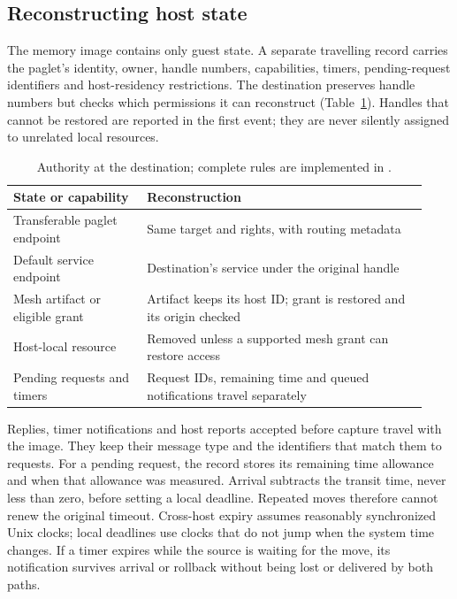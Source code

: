 \subsection{Reconstructing host state}\label{sec:movement-record}

The memory image contains only guest state. A separate travelling record
carries the paglet's identity, owner, handle numbers, capabilities, timers,
pending-request identifiers and host-residency restrictions. The
destination preserves handle numbers but checks which permissions it can
reconstruct (Table~\ref{tab:movement-caps}). Handles that cannot be restored
are reported in the first  event; they are never silently
assigned to unrelated local resources.

\begin{table}[!ht]
\centering\small
\caption{Authority at the destination; complete rules are implemented in
.}
\label{tab:movement-caps}
\begin{tabular}{p{0.30\linewidth}p{0.63\linewidth}}
\toprule
State or capability & Reconstruction \\
\midrule
Transferable paglet endpoint & Same target and rights, with routing metadata \\
Default service endpoint & Destination's service under the original handle \\
Mesh artifact or eligible grant & Artifact keeps its host ID; grant is restored and its origin checked \\
Host-local resource & Removed unless a supported mesh grant can restore access \\
Pending requests and timers & Request IDs, remaining time and queued notifications travel separately \\
\bottomrule
\end{tabular}
\end{table}

Replies, timer notifications and host reports accepted before capture
travel with the image. They keep their message type and the identifiers
that match them to requests. For a pending request, the record stores its
remaining time allowance and when that allowance was measured. Arrival
subtracts the transit time, never less than zero, before setting a local
deadline. Repeated moves therefore cannot renew the original timeout.
Cross-host expiry assumes reasonably synchronized Unix clocks; local
deadlines use clocks that do not jump when the system time changes.
If a timer expires while the source is waiting for the move, its
notification survives arrival or rollback without being lost or delivered
by both paths.

